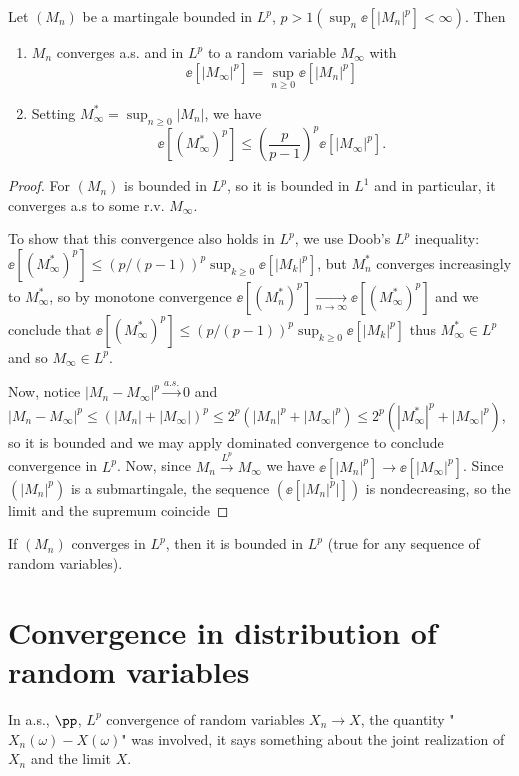 \documentclass[../main.tex]{subfiles}
\begin{document}
\begin{theorem}
  [$L^p$ Martingales]
  Let $(M_n)$ be a martingale bounded in $L^p$, $p > 1 (\sup_{n} \ee[|M_n|^p]
  < \infty)$. Then
  \begin{enumerate}
    \item $M_n$ converges a.s. and in $L^p$ to a random variable $M_{\infty}$
      with $$\ee[|M_{\infty}|^p] = \sup_{n \geq 0}\ee[|M_n|^p]$$
    \item Setting $M_{\infty}^* = \sup_{n \geq 0} |M_n|$, we have
      \[
        \ee[(M_{\infty}^*)^p] \leq \left(\frac{p}{p-1}\right)^p
        \ee[|M_{\infty}|^p] 
      .\] 
  \end{enumerate}
\end{theorem}
\begin{proof}
  For  $(M_n)$ is bounded in $L^p$, so it is bounded in $L^1$ and in
  particular, it converges a.s to some r.v. $M_\infty$. 

  To show that this
  convergence also holds in $L^p$, we use Doob's $L^p$ inequality:
  $\ee[(M_{\infty}^*)^p] \leq (p/(p-1))^p \sup_{k \geq 0} \ee[|M_k|^p]$, but 
  $M_n^*$ converges increasingly to $M_{\infty}^*$, so by monotone convergence
  $\ee[(M_n^{*})^p] \underset{n \to \infty}{\longrightarrow}
  \ee[(M_{\infty}^*)^p]$ and we conclude that $\ee[(M_{\infty}^*)^p] \leq
  (p/(p-1))^p \sup_{k \geq 0} \ee[|M_k|^p]$ thus $M_{\infty}^* \in L^p$ and so
   $M_{\infty} \in L^p$. 

   Now, notice $|M_n - M_{\infty}|^p \overset{a.s.}{\longrightarrow} 0$ and
   $|M_n - M_{\infty}|^p \leq (|M_n| + |M_{\infty}|)^p \leq 2^p (|M_n|^p +
   |M_{\infty}|^p) \leq 2^p (|M_{\infty}^*|^p +
   |M_{\infty}|^p)$, so it is bounded and we may apply dominated convergence
   to conclude convergence in $L^p$.
  Now, since $M_n \overset{L^p}{\longrightarrow} M_{\infty}$ we
   have $\ee[|M_n|^p] \to \ee[|M_{\infty}|^p]$. Since $(|M_n|^p)$ is a
   submartingale, the sequence $(\ee[|M_n|^p|])$ is nondecreasing, so the
   limit and the supremum coincide
\end{proof}
\begin{remark}
  If $(M_n)$ converges in $L^p$, then it is bounded in $L^p$ (true for any
  sequence of random variables).
\end{remark}

\section{Convergence in distribution of random variables}
In a.s., $\pp$, $L^p$ convergence of random variables $X_n \to X$, the
quantity "$X_n(\omega) - X(\omega)$" was involved, it says something about the
joint realization of $X_n$ and the limit $X$.
\end{document}
